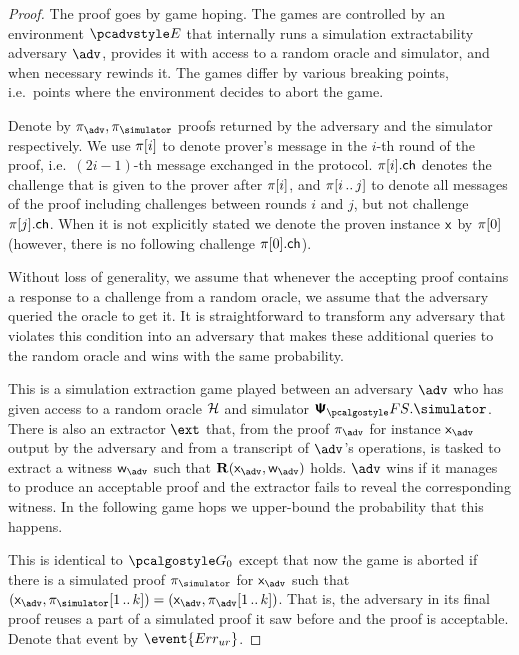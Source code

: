 \documentclass[runningheads,11pt]{llncs}
\theoremstyle{definition} \newtheorem{definition}[theorem]{Definition}
\begin{document}
\begin{proof}		
  The proof goes by game hoping. The games are controlled by an environment
  $\env$ that internally runs a simulation extractability adversary $\advse$,
  provides it with access to a random oracle and simulator, and when necessary
  rewinds it. The games differ by various breaking points, i.e.~points where the
  environment decides to abort the game.

  Denote by $\zkproof_{\advse}, \zkproof_{\simulator}$ proofs returned by the
  adversary and the simulator respectively. We use $\pi[i]$ to denote
  prover's message in the $i$-th round of the proof, i.e.~$(2i - 1)$-th message
  exchanged in the protocol. $\pi[i].\mathsf{ch}$ denotes the challenge that is
  given to the prover after $\pi[i]$, and $\pi[i \, .. \, j]$ to denote
  all messages of the proof including challenges between rounds $i$ and $j$, but
  not challenge $\pi[j].\mathsf{ch}$. When it is not explicitly stated we denote
  the proven instance $\mathsf{x}$ by $\pi[0]$ (however, there is no following
  challenge $\pi[0].\mathsf{ch}$).

  Without loss of generality, we assume that whenever the accepting proof
  contains a response to a challenge from a random oracle, we assume that the
  adversary queried the oracle to get it. It is straightforward to transform any
  adversary that violates this condition into an adversary that makes these
  additional queries to the random oracle and wins with the same probability.

   This is a simulation extraction game played between an adversary
  $\advse$ who has given access to a random oracle $\mathcal{H}$ and simulator
  $\psfs.\simulator$. There is also an extractor $\ext$ that, from the proof
  $\zkproof_{\advse}$ for instance $\inp_{\advse}$ output by the adversary and
  from a transcript of $\advse$'s operations, is tasked to extract a witness
  $\wit_{\advse}$ such that $\REL(\inp_{\advse}, \wit_{\advse})$ holds. $\advse$
  wins if it manages to produce an acceptable proof and the extractor fails to
  reveal the corresponding witness. In the following game hops we upper-bound
  the probability that this happens.

   This is identical to $\game{0}$ except that now the game is aborted
  if there is a simulated proof $\zkproof_\simulator$ for $\inp_{\advse}$ such
  that $(\inp_{\advse}, \zkproof_\simulator\range{1}{k}) = (\inp_{\advse},
  \zkproof_{\advse}\range{1}{k})$. That is, the adversary in its final proof
  reuses a part of a simulated proof it saw before and the proof is acceptable.
  Denote that event by $\event{\errur}$.


\end{proof}
\end{document}
